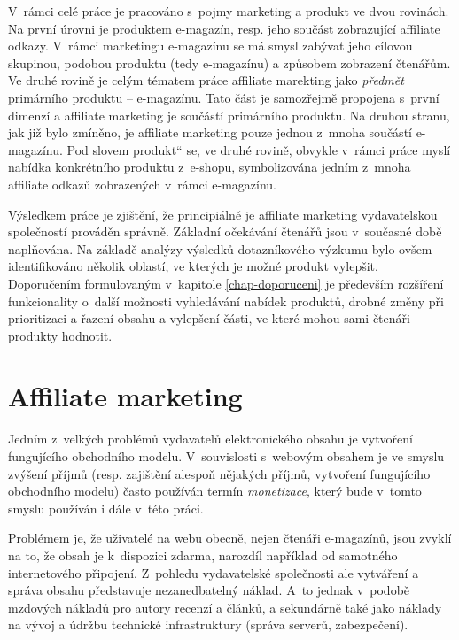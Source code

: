 \documentclass[12pt,oneside,openany]{fithesis}
\makeatletter
\def\cleardoublepage{\clearpage\if@twoside \ifodd\c@page\else
        \thispagestyle{empty}
        \hbox{}\newpage\if@twocolumn\hbox{}\newpage\fi\fi\fi}
\makeatother
\begin{document}
V~rámci celé práce je pracováno s~pojmy marketing a produkt ve dvou 
rovinách. Na první úrovni je produktem e-magazín, resp. jeho součást 
zobrazující affiliate odkazy. V~rámci marketingu e-magazínu se má smysl 
zabývat jeho cílovou skupinou, podobou produktu (tedy e-magazínu) a 
způsobem zobrazení čtenářům. Ve druhé rovině je celým tématem práce 
affiliate marekting jako {\em{předmět}} primárního produktu -- e-magazínu. 
Tato část je samozřejmě propojena s~první dimenzí a affiliate marketing 
je součástí primárního produktu. Na druhou stranu, jak již bylo 
zmíněno, je affiliate marketing pouze jednou z~mnoha součástí e-magazínu. 
Pod slovem \glqq produkt\textquotedblleft{} se, ve druhé rovině, obvykle 
v~rámci práce myslí nabídka konkrétního produktu z~e-shopu, 
symbolizována jedním z~mnoha affiliate odkazů zobrazených v~rámci 
e-magazínu.

Výsledkem práce je zjištění, že principiálně je affiliate marketing 
vydavatelskou společností prováděn správně. Základní očekávání 
čtenářů jsou v~současné době naplňována. Na základě analýzy 
výsledků dotazníkového výzkumu bylo ovšem identifikováno několik 
oblastí, ve kterých je možné produkt vylepšit. Doporučením formulovaným 
v~kapitole \hyperlink{chap-doporuceni}{{\ref{chap-doporuceni}}} je především 
rozšíření funkcionality o~další možnosti vyhledávání nabídek 
produktů, drobné změny při prioritizaci a řazení obsahu a vylepšení 
části, ve které mohou sami čtenáři produkty hodnotit.

\newpage\null\thispagestyle{empty}\newpage

\cleardoublepage\chapter{Affiliate marketing}
\label{chap-am}\hypertarget{chap-am}{}%

Jedním z~velkých problémů vydavatelů elektronického obsahu je vytvoření 
fungujícího obchodního modelu. V~souvislosti s~webovým obsahem je ve smyslu 
zvýšení příjmů (resp. zajištění alespoň nějakých příjmů, 
vytvoření fungujícího obchodního modelu) často používán termín 
{\em{monetizace}}, který bude v~tomto smyslu používán i 
dále v~této práci.

Problémem je, že uživatelé na webu obecně, nejen čtenáři e-magazínů, 
jsou zvyklí na to, že obsah je k~dispozici zdarma, narozdíl například od 
samotného internetového připojení. \cite{lupa-datator}{} Z~pohledu 
vydavatelské společnosti ale vytváření a správa obsahu představuje 
nezanedbatelný náklad. A~to jednak v~podobě mzdových nákladů pro autory 
recenzí a článků, a sekundárně také jako náklady na vývoj a údržbu 
technické infrastruktury (správa serverů, zabezpečení).
\end{document}
